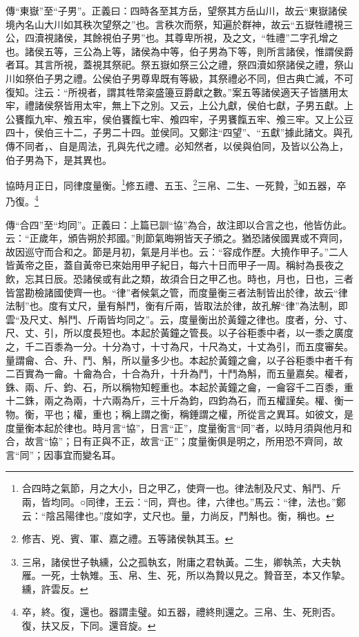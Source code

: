 {\noindent\zhuan{}\fzbyks 傳“東嶽”至“子男”。正義曰：四時各至其方岳，望祭其方岳山川，故云“東嶽諸侯境內名山大川如其秩次望祭之”也。言秩次而祭，知遍於群神，故云“五嶽牲禮視三公，四瀆視諸侯，其餘視伯子男”也。其尊卑所視，及之文，“牲禮”二字孔增之也。諸侯五等，三公為上等，諸侯為中等，伯子男為下等，則所言諸侯，惟謂侯爵者耳。其言所視，蓋視其祭祀。祭五嶽如祭三公之禮，祭四瀆如祭諸侯之禮，祭山川如祭伯子男之禮。公侯伯子男尊卑既有等級，其祭禮必不同，但古典亡滅，不可復知。注云：“所視者，謂其牲幣粢盛籩豆爵獻之數。”案五等諸侯適天子皆膳用太牢，禮諸侯祭皆用太牢，無上下之別。又云，上公九獻，侯伯七獻，子男五獻。上公饔餼九牢、飧五牢，侯伯饔餼七牢、飧四牢，子男饔餼五牢、飧三牢。又上公豆四十，侯伯三十二，子男二十四。並侯同。又鄭注“四望”、“五獻”據此諸文。與孔傳不同者，、自是周法，孔與先代之禮。必知然者，以侯與伯同，及皆以公為上，伯子男為下，是其異也。 \par}

協時月正日，同律度量衡。\footnote{合四時之氣節，月之大小，日之甲乙，使齊一也。律法制及尺丈、斛鬥、斤兩，皆均同。○同律，王云：“同，齊也。律，六律也。”馬云：“律，法也。”鄭云：“陰呂陽律也。”度如字，丈尺也。量，力尚反，鬥斛也。衡，稱也。}修五禮、五玉、\footnote{修吉、兇、賓、軍、嘉之禮。五等諸侯執其玉。}三帛、二生、一死贄，\footnote{三帛，諸侯世子執纁，公之孤執玄，附庸之君執黃。二生，卿執羔，大夫執雁。一死，士執雉。玉、帛、生、死，所以為贄以見之。贄音至，本又作摯。纁，許雲反。}如五器，卒乃復。\footnote{卒，終。復，還也。器謂圭璧。如五器，禮終則還之。三帛、生、死則否。復，扶又反，下同。還音旋。}

{\noindent\zhuan{}\fzbyks 傳“合四”至“均同”。正義曰：上篇已訓“協”為合，故注即以合言之也，他皆仿此。云：“正歲年，頒告朔於邦國。”則節氣晦朔皆天子頒之。猶恐諸侯國異或不齊同，故因巡守而合和之。節是月初，氣是月半也。云：“容成作歷。大撓作甲子。”二人皆黃帝之臣，蓋自黃帝已來始用甲子紀日，每六十日而甲子一周。稱紂為長夜之飲，忘其日辰。恐諸侯或有此之類，故須合日之甲乙也。時也，月也，日也，三者皆當勘檢諸國使齊一也。“律”者候氣之管，而度量衡三者法制皆出於律，故云“律法制”也。度有丈尺，量有斛鬥，衡有斤兩，皆取法於律，故孔解“律”為法制，即雲“及尺丈、斛鬥、斤兩皆均同之”。云，度量衡出於黃鐘之律也。度者，分、寸、尺、丈、引，所以度長短也。本起於黃鐘之管長。以子谷秬黍中者，以一黍之廣度之，千二百黍為一分。十分為寸，十寸為尺，十尺為丈，十丈為引，而五度審矣。量謂龠、合、升、鬥、斛，所以量多少也。本起於黃鐘之龠，以子谷秬黍中者千有二百實為一龠。十龠為合，十合為升，十升為鬥，十鬥為斛，而五量嘉矣。權者，銖、兩、斤、鈞、石，所以稱物知輕重也。本起於黃鐘之龠，一龠容千二百黍，重十二銖，兩之為兩，十六兩為斤，三十斤為鈞，四鈞為石，而五權謹矣。權、衡一物。衡，平也；權，重也；稱上謂之衡，稱錘謂之權，所從言之異耳。如彼文，是度量衡本起於律也。時月言“協”，日言“正”，度量衡言“同”者，以時月須與他月和合，故言“協”；日有正與不正，故言“正”；度量衡俱是明之，所用恐不齊同，故言“同”；因事宜而變名耳。 \par}

